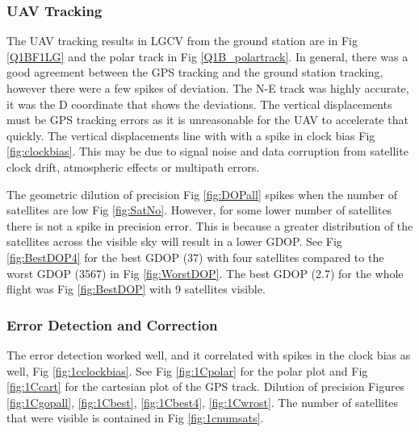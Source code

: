 \documentclass[Space3_Assign2]{subfile}
\begin{document}
\subsubsection{UAV Tracking}
The UAV tracking results in LGCV from the ground station are in Fig \ref{Q1BF1LG} and the polar track in Fig \ref{Q1B_polartrack}. In general, there was a good agreement between the GPS tracking and the ground station tracking, however there were a few spikes of deviation. The N-E track was highly accurate, it was the D coordinate that shows the deviations. The vertical displacements must be GPS tracking errors as it is unreasonable for the UAV to accelerate that quickly. The vertical displacements line with with a spike in clock bias Fig \ref{fig:clockbias}. This may be due to signal noise and data corruption from satellite clock drift, atmospheric effects or multipath errors.

The geometric dilution of precision Fig \ref{fig:DOPall} spikes when the number of satellites are low Fig \ref{fig:SatNo}. However, for some lower number of satellites there is not a spike in precision error. This is because a greater distribution of the satellites across the visible sky will result in a lower GDOP. See Fig \ref{fig:BestDOP4} for the best GDOP (37) with four satellites compared to the worst GDOP (3567) in Fig \ref{fig:WorstDOP}. The best GDOP (2.7) for the whole flight was Fig \ref{fig:BestDOP} with 9 satellites visible.

\subsubsection{Error Detection and Correction}
The error detection worked well, and it correlated with spikes in the clock bias as well, Fig \ref{fig:1cclockbias}. See Fig \ref{fig:1Cpolar} for the polar plot and Fig \ref{fig:1Ccart} for the cartesian plot of the GPS track. Dilution of precision Figures \ref{fig:1Cgopall}, \ref{fig:1Cbest}, \ref{fig:1Cbest4}, \ref{fig:1Cwrost}. The number of satellites that were visible is contained in Fig \ref{fig:1cnumsats}.
\end{document}
